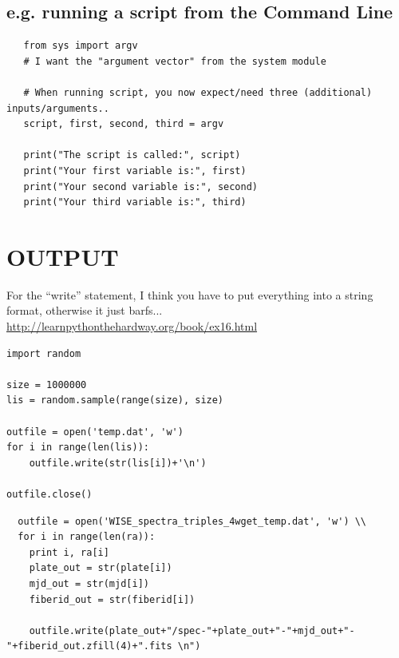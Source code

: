 \documentclass[11pt,a4paper]{article}
\begin{document}
    \subsection{e.g. running a script from the Command Line}
    \begin{lstlisting}
   from sys import argv
   # I want the "argument vector" from the system module

   # When running script, you now expect/need three (additional) inputs/arguments..
   script, first, second, third = argv

   print("The script is called:", script)
   print("Your first variable is:", first)
   print("Your second variable is:", second)
   print("Your third variable is:", third)
   \end{lstlisting}



\newpage
\section{OUTPUT}
For the ``write'' statement, I think you have to put everything into 
a string format, otherwise it just barfs... \\
\href{http://learnpythonthehardway.org/book/ex16.html}{http://learnpythonthehardway.org/book/ex16.html}

\noindent
\begin{lstlisting}
import random

size = 1000000
lis = random.sample(range(size), size)

outfile = open('temp.dat', 'w')
for i in range(len(lis)):
    outfile.write(str(lis[i])+'\n')
    
outfile.close()
\end{lstlisting}

\begin{lstlisting}
  outfile = open('WISE_spectra_triples_4wget_temp.dat', 'w') \\
  for i in range(len(ra)): 
    print i, ra[i] 
    plate_out = str(plate[i])
    mjd_out = str(mjd[i]) 
    fiberid_out = str(fiberid[i])

    outfile.write(plate_out+"/spec-"+plate_out+"-"+mjd_out+"-"+fiberid_out.zfill(4)+".fits \n")
\end{lstlisting}
\end{document}
